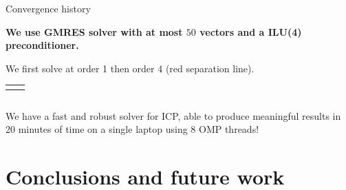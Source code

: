 \documentclass[24pt,t,table, aspectratio=169]{beamer}
\begin{document}
\begin{frame}{Convergence history}

\textbf{We use GMRES solver with at most $50$ vectors and a ILU(4) preconditioner.}

We first solve at order 1 then order 4 (red separation line).

\begin{center}
{
\begin{tabular}{cc}
 & 
\end{tabular}
}
{
\begin{tabular}{c}

\end{tabular}
}
\end{center}

{
We have a fast and robust solver for ICP, able to produce meaningful results in 20 minutes of time on a single laptop using 8 OMP threads!
}

\end{frame}

\begin{frame}

\end{frame}

\section{Conclusions and future work}
\end{document}
